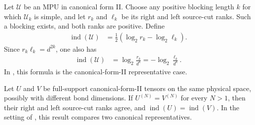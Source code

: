 \begin{definition}
    \label{def:mpu_admissible_index}
    \leanok
    Let $\mathcal U$ be an MPU in canonical form II. Choose any positive
    blocking length $k$ for which $\mathcal U_k$ is simple, and let $r_k$ and
    $\ell_k$ be its right and left source-cut ranks. Such a blocking exists,
    and both ranks are positive. Define
    \begin{align}
        \operatorname{ind}(\mathcal U)
         & =\frac12(\log_2 r_k-\log_2\ell_k).
    \end{align}
    Since $r_k\ell_k=d^{2k}$, one also has
    \begin{align}
        \operatorname{ind}(\mathcal U)
         & =\log_2\frac{r_k}{d^k}
        =-\log_2\frac{\ell_k}{d^k}.
    \end{align}
    In \cite[Definition~IV.1]{Cirac2017MPU}, this formula is the canonical-form-II representative
    case.
\end{definition}

\begin{lemma}
    \label{thm:mpu_cfii_index_periodic_comparison}
    \leanok
    Let $U$ and $V$ be full-support canonical-form-II tensors on the same
    physical space, possibly with different bond dimensions. If
    $U^{(N)}=V^{(N)}$ for every $N>1$, then their right and left source-cut
    ranks agree, and $\operatorname{ind}(U)=\operatorname{ind}(V)$.
    In the setting of \cite[Definition~IV.1 and Proposition~IV.2]{Cirac2017MPU}, this result compares two canonical
    representatives.
\end{lemma}

